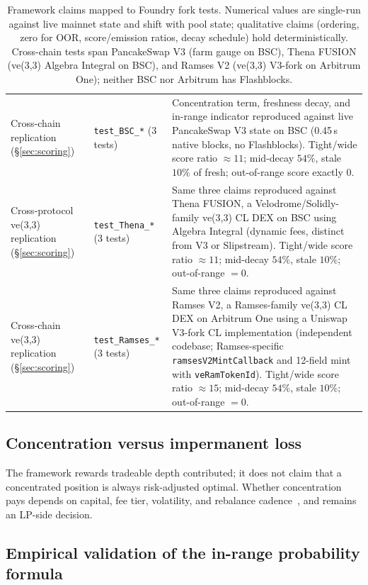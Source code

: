 \documentclass[11pt,a4paper]{article}
\theoremstyle{cgdefinition}
\theoremstyle{cgplain}
\theoremstyle{cgremark}
\begin{document}
\begin{table}[H]
\begin{tabular}{@{}L{3.2cm}L{4.2cm}L{7.2cm}@{}}
Cross-chain replication (\S\ref{sec:scoring}) & \texttt{test\_BSC\_*} (3 tests) & Concentration term, freshness decay, and in-range indicator reproduced against live PancakeSwap V3 state on BSC (0.45\,s native blocks, no Flashblocks). Tight/wide score ratio $\approx 11$; mid-decay $54\%$, stale $10\%$ of fresh; out-of-range score exactly $0$. \\
\addlinespace
Cross-protocol ve(3,3) replication (\S\ref{sec:scoring}) & \texttt{test\_Thena\_*} (3 tests) & Same three claims reproduced against Thena FUSION, a Velodrome/Solidly-family ve(3,3) CL DEX on BSC using Algebra Integral (dynamic fees, distinct from V3 or Slipstream). Tight/wide score ratio $\approx 11$; mid-decay $54\%$, stale $10\%$; out-of-range $= 0$. \\
\addlinespace
Cross-chain ve(3,3) replication (\S\ref{sec:scoring}) & \texttt{test\_Ramses\_*} (3 tests) & Same three claims reproduced against Ramses V2, a Ramses-family ve(3,3) CL DEX on Arbitrum One using a Uniswap V3-fork CL implementation (independent codebase; Ramses-specific \texttt{ramsesV2MintCallback} and 12-field mint with \texttt{veRamTokenId}). Tight/wide score ratio $\approx 15$; mid-decay $54\%$, stale $10\%$; out-of-range $= 0$. \\
\bottomrule
\end{tabular}
\caption{Framework claims mapped to Foundry fork tests. Numerical values are single-run against live mainnet state and shift with pool state; qualitative claims (ordering, zero for OOR, score/emission ratios, decay schedule) hold deterministically. Cross-chain tests span PancakeSwap V3 (farm gauge on BSC), Thena FUSION (ve(3,3) Algebra Integral on BSC), and Ramses V2 (ve(3,3) V3-fork on Arbitrum One); neither BSC nor Arbitrum has Flashblocks.}
\label{tab:forkmap}
\end{table}

\subsection{Concentration versus impermanent loss}\label{sec:nuance}

The framework rewards tradeable depth contributed; it does not claim that a concentrated position is always risk-adjusted optimal. Whether concentration pays depends on capital, fee tier, volatility, and rebalance cadence~\cite{milionis2022b}, and remains an LP-side decision.

\subsection{Empirical validation of the in-range probability formula}\label{sec:empirical-pin}
\end{document}
